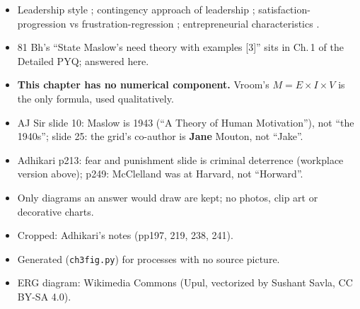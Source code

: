 \begin{itemize}
  \item Leadership style ; contingency approach of leadership ;
    satisfaction-progression vs frustration-regression ; entrepreneurial
    characteristics .
  \item 81 Bh's ``State Maslow's need theory with examples [3]'' sits in Ch.\,1 of the
    Detailed PYQ; answered here.
\end{itemize}

\begin{itemize}
  \item \textbf{This chapter has no numerical component.} Vroom's $M = E \times I \times V$ is
    the only formula, used qualitatively.
\end{itemize}

\begin{itemize}
  \item AJ Sir slide 10: Maslow is 1943 (``A Theory of Human Motivation''), not ``the
    1940s''; slide 25: the grid's co-author is \textbf{Jane} Mouton, not ``Jake''.
  \item Adhikari p213: fear and punishment slide is criminal deterrence (workplace version
    above); p249: McClelland was at Harvard, not ``Horward''.
\end{itemize}

\begin{itemize}
  \item Only diagrams an answer would draw are kept; no photos, clip art or decorative
    charts.
  \item Cropped: Adhikari's notes (pp197, 219, 238, 241).
  \item Generated (\texttt{ch3fig.py}) for processes with no source picture.
  \item ERG diagram: Wikimedia Commons (Upul, vectorized by Sushant Savla, CC BY-SA 4.0).
\end{itemize}
